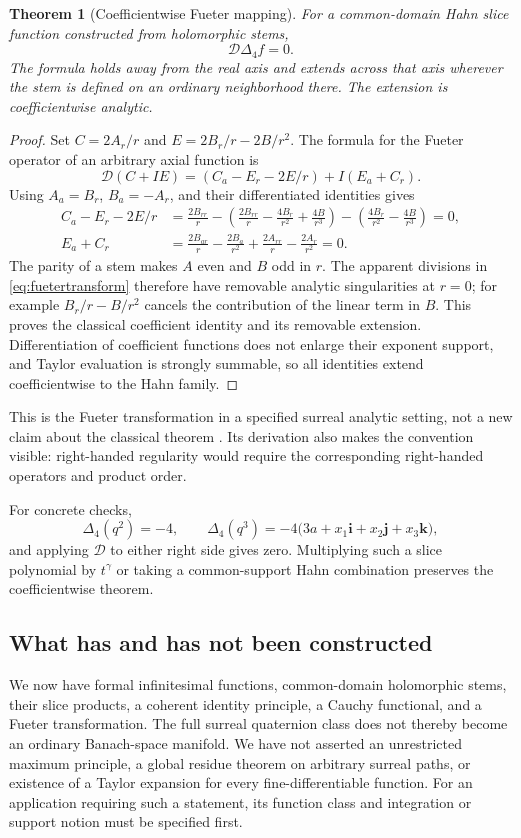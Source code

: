 \documentclass[11pt,letterpaper]{article}
\numberwithin{equation}{section}
\newtheorem{theorem}{Theorem}[section]
\theoremstyle{definition}
\theoremstyle{remark}
\newcommand{\ii}{\mathbf i}
\newcommand{\jj}{\mathbf j}
\newcommand{\kk}{\mathbf k}
\newcommand{\DD}{\mathcal D}
\begin{document}
\begin{theorem}[Coefficientwise Fueter mapping]\label{thm:fueter}
For a common-domain Hahn slice function constructed from holomorphic stems,
\begin{equation}\label{eq:fuetertheorem}
 \DD\Delta_4 f=0.
\end{equation}
The formula holds away from the real axis and extends across that axis wherever the stem is
defined on an ordinary neighborhood there. The extension is coefficientwise analytic.
\end{theorem}
\begin{proof}
Set $C=2A_r/r$ and $E=2B_r/r-2B/r^2$. The formula for the Fueter operator of an arbitrary
axial function is
\[
 \DD(C+IE)=(C_a-E_r-2E/r)+I(E_a+C_r).
\]
Using $A_a=B_r$, $B_a=-A_r$, and their differentiated identities gives
\begin{align*}
 C_a-E_r-2E/r
 &=\frac{2B_{rr}}r-
   \left(\frac{2B_{rr}}r-\frac{4B_r}{r^2}+\frac{4B}{r^3}\right)
   -\left(\frac{4B_r}{r^2}-\frac{4B}{r^3}\right)=0,\\
 E_a+C_r
 &=\frac{2B_{ar}}r-\frac{2B_a}{r^2}
   +\frac{2A_{rr}}r-\frac{2A_r}{r^2}=0.
\end{align*}
The parity of a stem makes $A$ even and $B$ odd in $r$. The apparent divisions in
\eqref{eq:fuetertransform} therefore have removable analytic singularities at $r=0$;
for example $B_r/r-B/r^2$ cancels the contribution of the linear term in $B$.
This proves the classical coefficient identity and its removable extension. Differentiation
of coefficient functions does not enlarge their exponent support, and Taylor evaluation is
strongly summable, so all identities extend coefficientwise to the Hahn family.
\end{proof}

This is the Fueter transformation in a specified surreal analytic setting, not a new claim
about the classical theorem \cite{GP}. Its derivation also makes the convention visible:
right-handed regularity would require the corresponding right-handed operators and product
order.

For concrete checks,
\[
 \Delta_4(q^2)=-4,\qquad
 \Delta_4(q^3)=-4\bigl(3a+x_1\ii+x_2\jj+x_3\kk\bigr),
\]
and applying $\DD$ to either right side gives zero. Multiplying such a slice polynomial by
$t^\gamma$ or taking a common-support Hahn combination preserves the coefficientwise theorem.

\subsection{What has and has not been constructed}
We now have formal infinitesimal functions, common-domain holomorphic stems, their slice
products, a coherent identity principle, a Cauchy functional, and a Fueter transformation.
The full surreal quaternion class does not thereby become an ordinary Banach-space manifold.
We have not asserted an unrestricted maximum principle, a global residue theorem on arbitrary
surreal paths, or existence of a Taylor expansion for every fine-differentiable function.
For an application requiring such a statement, its function class and integration or support
notion must be specified first.
\end{document}
